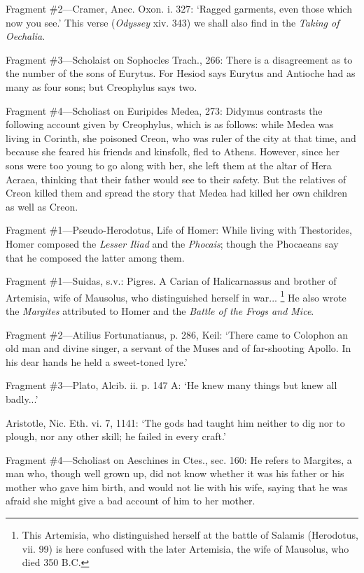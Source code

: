 Fragment \#2—Cramer, Anec. Oxon. i. 327: ‘Ragged garments, even
those which now you see.’ This verse (\emph{Odyssey} xiv. 343) we
shall also find in the \emph{Taking of Oechalia}.

Fragment \#3—Scholaist on Sophocles Trach., 266: There is a disagreement
as to the number of the sons of Eurytus. For Hesiod says Eurytus and Antioche
had as many as four sons; but Creophylus says two.

Fragment \#4—Scholiast on Euripides Medea, 273: Didymus contrasts the
following account given by Creophylus, which is as follows: while Medea was
living in Corinth, she poisoned Creon, who was ruler of the city at that time,
and because she feared his friends and kinsfolk, fled to Athens. However, since
her sons were too young to go along with her, she left them at the altar of
Hera Acraea, thinking that their father would see to their safety. But the
relatives of Creon killed them and spread the story that Medea had killed her
own children as well as Creon.


Fragment \#1—Pseudo-Herodotus, Life of Homer: While living with
Thestorides, Homer composed the \emph{Lesser Iliad} and the
\emph{Phocais}; though the Phocaeans say that he composed the latter
among them.


Fragment \#1—Suidas, s.v.: Pigres. A Carian of Halicarnassus and brother
of Artemisia, wife of Mausolus, who distinguished herself in war... \footnote{This Artemisia, who
distinguished herself at the battle of Salamis (Herodotus, vii. 99) is here
confused with the later Artemisia, the wife of Mausolus, who died 350 B.C.} He also wrote the
\emph{Margites} attributed to Homer and the \emph{Battle of the Frogs
and Mice}.

Fragment \#2—Atilius Fortunatianus, p. 286, Keil: ‘There came to
Colophon an old man and divine singer, a servant of the Muses and of
far-shooting Apollo. In his dear hands he held a sweet-toned lyre.’

Fragment \#3—Plato, Alcib. ii. p. 147 A: ‘He knew many things but
knew all badly...’

Aristotle, Nic. Eth. vi. 7, 1141: ‘The gods had taught him neither to dig
nor to plough, nor any other skill; he failed in every craft.’

Fragment \#4—Scholiast on Aeschines in Ctes., sec. 160: He refers to
Margites, a man who, though well grown up, did not know whether it was his
father or his mother who gave him birth, and would not lie with his wife,
saying that he was afraid she might give a bad account of him to her mother.

